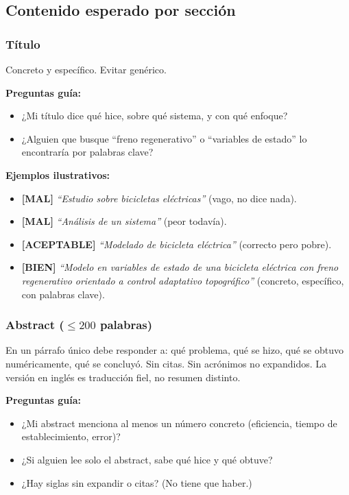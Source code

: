 \documentclass[11pt,a4paper]{article}
\newcommand{\malo}{\textcolor{red!70!black}{\textbf{[MAL]}}}
\newcommand{\medio}{\textcolor{orange!80!black}{\textbf{[ACEPTABLE]}}}
\newcommand{\bueno}{\textcolor{green!50!black}{\textbf{[BIEN]}}}
\begin{document}
\subsection{Contenido esperado por sección}

\subsubsection{Título}

Concreto y específico. Evitar genérico.

\begin{guia}
\textbf{Preguntas guía:}
\begin{itemize}
    \item ¿Mi título dice qué hice, sobre qué sistema, y con qué enfoque?
    \item ¿Alguien que busque ``freno regenerativo'' o ``variables de estado'' lo encontraría por palabras clave?
\end{itemize}
\end{guia}

\begin{ejemplo}
\textbf{Ejemplos ilustrativos:}
\begin{itemize}
    \item \malo{} \textit{``Estudio sobre bicicletas eléctricas''} (vago, no dice nada).
    \item \malo{} \textit{``Análisis de un sistema''} (peor todavía).
    \item \medio{} \textit{``Modelado de bicicleta eléctrica''} (correcto pero pobre).
    \item \bueno{} \textit{``Modelo en variables de estado de una bicicleta eléctrica con freno regenerativo orientado a control adaptativo topográfico''} (concreto, específico, con palabras clave).
\end{itemize}
\end{ejemplo}

\subsubsection{Abstract (\texorpdfstring{$\leq 200$}{<=200} palabras)}

En un párrafo único debe responder a: qué problema, qué se hizo, qué se obtuvo numéricamente, qué se concluyó. Sin citas. Sin acrónimos no expandidos. La versión en inglés es traducción fiel, no resumen distinto.

\begin{guia}
\textbf{Preguntas guía:}
\begin{itemize}
    \item ¿Mi abstract menciona al menos un número concreto (eficiencia, tiempo de establecimiento, error)?
    \item ¿Si alguien lee solo el abstract, sabe qué hice y qué obtuve?
    \item ¿Hay siglas sin expandir o citas? (No tiene que haber.)
\end{itemize}
\end{guia}
\end{document}

